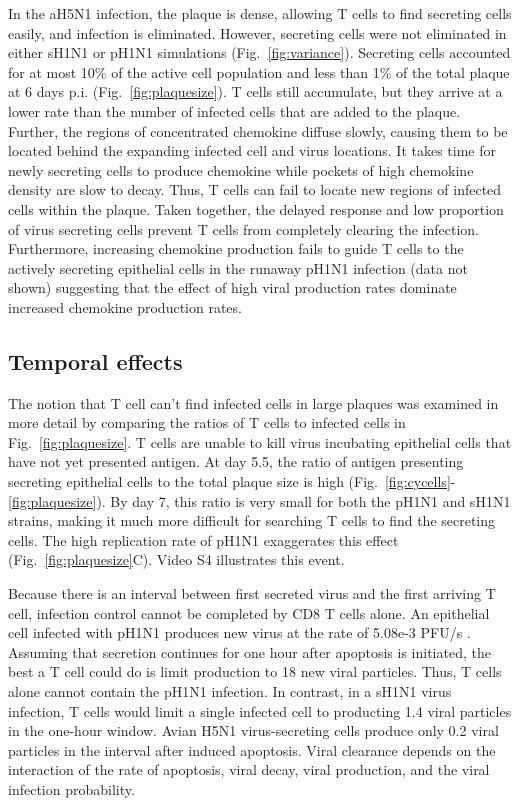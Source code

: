 \documentclass[10pt]{article}
\begin{document}
In the aH5N1 infection, the plaque is dense, allowing T cells to find secreting cells easily, and infection is eliminated.  However, secreting cells were not eliminated in either sH1N1 or pH1N1 simulations (Fig.~\ref{fig:variance}).  Secreting cells accounted for at most 10\% of the active cell population and less than 1\% of the total plaque at 6 days p.i. (Fig.~\ref{fig:plaquesize}).  T cells still accumulate, but they arrive at a lower rate than the number of infected cells that are added to the plaque.  Further, the regions of concentrated chemokine diffuse slowly, causing them to be located behind the expanding infected cell and virus locations.  It takes time for newly secreting cells to produce chemokine while pockets of high chemokine density are slow to decay.  Thus, T cells can fail to locate new regions of infected cells within the plaque.  Taken together, the delayed response and low proportion of virus secreting cells prevent T cells from completely clearing the infection.  Furthermore, increasing chemokine production fails to guide T cells to the actively secreting epithelial cells in the runaway pH1N1 infection (data not shown) suggesting that the effect of high viral production rates dominate increased chemokine production rates.

\subsection*{Temporal effects}

The notion that T cell can't find infected cells in large plaques was examined in more detail by comparing the ratios of T cells to infected cells in Fig.~\ref{fig:plaquesize}.  T cells are unable to kill virus incubating epithelial cells that have not yet presented antigen.  At day 5.5, the ratio of antigen presenting secreting epithelial cells to the total plaque size is high (Fig.~\ref{fig:cycells}-\ref{fig:plaquesize}). By day 7, this ratio is very small for both the pH1N1 and sH1N1 strains, making it much more difficult for searching T cells to find the secreting cells.  The high replication rate of pH1N1 exaggerates this effect (Fig.~\ref{fig:plaquesize}C).  Video S4 illustrates this event.

Because there is an interval between first secreted virus and the first arriving T cell, infection control cannot be completed by CD8 T cells alone.  An epithelial cell infected with pH1N1 produces new virus at the rate of 5.08e-3 PFU/s \cite{Mitchell2011}.  Assuming that secretion continues for one hour after apoptosis is initiated, the best a T cell could do is limit production to 18 new viral particles.  Thus, T cells alone cannot contain the pH1N1 infection.  In contrast, in a sH1N1 virus infection, T cells would limit a single infected cell to producting 1.4 viral particles in the one-hour window.  Avian H5N1 virus-secreting cells produce only 0.2 viral particles in the interval after induced apoptosis.  Viral clearance depends on the interaction of the rate of apoptosis, viral decay, viral production, and the viral infection probability.
\end{document}
